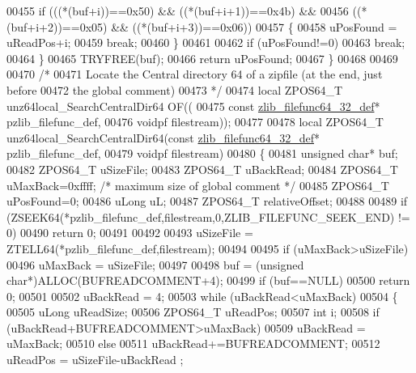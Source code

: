 \begin{DoxyCode}
00455             \textcolor{keywordflow}{if} (((*(buf+i))==0x50) && ((*(buf+i+1))==0x4b) &&
00456                 ((*(buf+i+2))==0x05) && ((*(buf+i+3))==0x06))
00457             \{
00458                 uPosFound = uReadPos+i;
00459                 \textcolor{keywordflow}{break};
00460             \}
00461 
00462         \textcolor{keywordflow}{if} (uPosFound!=0)
00463             \textcolor{keywordflow}{break};
00464     \}
00465     TRYFREE(buf);
00466     \textcolor{keywordflow}{return} uPosFound;
00467 \}
00468 
00469 
00470 \textcolor{comment}{/*}
00471 \textcolor{comment}{  Locate the Central directory 64 of a zipfile (at the end, just before}
00472 \textcolor{comment}{    the global comment)}
00473 \textcolor{comment}{*/}
00474 local ZPOS64\_T unz64local\_SearchCentralDir64 OF((
00475     \textcolor{keyword}{const} \hyperlink{structzlib__filefunc64__32__def__s}{zlib\_filefunc64\_32\_def}* pzlib\_filefunc\_def,
00476     voidpf filestream));
00477 
00478 local ZPOS64\_T unz64local\_SearchCentralDir64(\textcolor{keyword}{const} \hyperlink{structzlib__filefunc64__32__def__s}{zlib\_filefunc64\_32\_def}* 
      pzlib\_filefunc\_def,
00479                                       voidpf filestream)
00480 \{
00481     \textcolor{keywordtype}{unsigned} \textcolor{keywordtype}{char}* buf;
00482     ZPOS64\_T uSizeFile;
00483     ZPOS64\_T uBackRead;
00484     ZPOS64\_T uMaxBack=0xffff; \textcolor{comment}{/* maximum size of global comment */}
00485     ZPOS64\_T uPosFound=0;
00486     uLong uL;
00487                 ZPOS64\_T relativeOffset;
00488 
00489     \textcolor{keywordflow}{if} (ZSEEK64(*pzlib\_filefunc\_def,filestream,0,ZLIB\_FILEFUNC\_SEEK\_END) != 0)
00490         \textcolor{keywordflow}{return} 0;
00491 
00492 
00493     uSizeFile = ZTELL64(*pzlib\_filefunc\_def,filestream);
00494 
00495     \textcolor{keywordflow}{if} (uMaxBack>uSizeFile)
00496         uMaxBack = uSizeFile;
00497 
00498     buf = (\textcolor{keywordtype}{unsigned} \textcolor{keywordtype}{char}*)ALLOC(BUFREADCOMMENT+4);
00499     \textcolor{keywordflow}{if} (buf==NULL)
00500         \textcolor{keywordflow}{return} 0;
00501 
00502     uBackRead = 4;
00503     \textcolor{keywordflow}{while} (uBackRead<uMaxBack)
00504     \{
00505         uLong uReadSize;
00506         ZPOS64\_T uReadPos;
00507         \textcolor{keywordtype}{int} i;
00508         \textcolor{keywordflow}{if} (uBackRead+BUFREADCOMMENT>uMaxBack)
00509             uBackRead = uMaxBack;
00510         \textcolor{keywordflow}{else}
00511             uBackRead+=BUFREADCOMMENT;
00512         uReadPos = uSizeFile-uBackRead ;

\end{DoxyCode}
